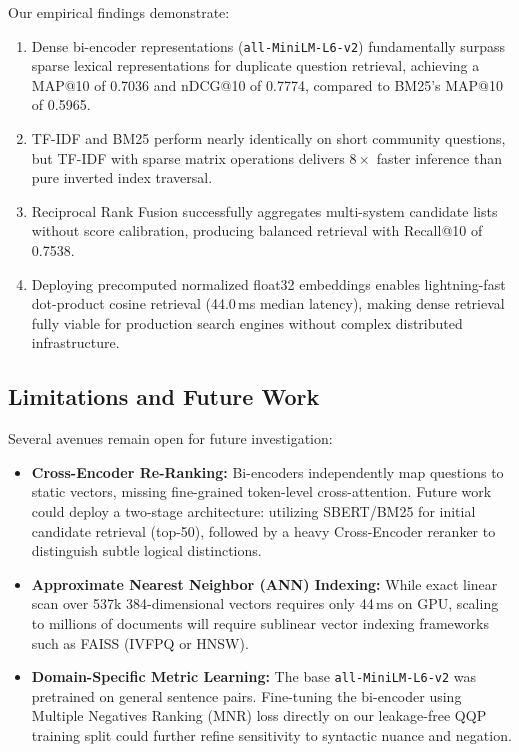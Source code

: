\documentclass[11pt,a4paper]{article}
\begin{document}
Our empirical findings demonstrate:
\begin{enumerate}[noitemsep,topsep=1pt]
    \item Dense bi-encoder representations (\texttt{all-MiniLM-L6-v2}) fundamentally surpass sparse lexical representations for duplicate question retrieval, achieving a MAP@10 of 0.7036 and nDCG@10 of 0.7774, compared to BM25's MAP@10 of 0.5965.
    \item TF-IDF and BM25 perform nearly identically on short community questions, but TF-IDF with sparse matrix operations delivers $8\times$ faster inference than pure inverted index traversal.
    \item Reciprocal Rank Fusion successfully aggregates multi-system candidate lists without score calibration, producing balanced retrieval with Recall@10 of 0.7538.
    \item Deploying precomputed normalized float32 embeddings enables lightning-fast dot-product cosine retrieval (44.0\,ms median latency), making dense retrieval fully viable for production search engines without complex distributed infrastructure.
\end{enumerate}

\subsection{Limitations and Future Work}
Several avenues remain open for future investigation:
\begin{itemize}[noitemsep,topsep=1pt]
    \item \textbf{Cross-Encoder Re-Ranking:} Bi-encoders independently map questions to static vectors, missing fine-grained token-level cross-attention. Future work could deploy a two-stage architecture: utilizing SBERT/BM25 for initial candidate retrieval (top-50), followed by a heavy Cross-Encoder reranker to distinguish subtle logical distinctions.
    \item \textbf{Approximate Nearest Neighbor (ANN) Indexing:} While exact linear scan over 537k 384-dimensional vectors requires only 44\,ms on GPU, scaling to millions of documents will require sublinear vector indexing frameworks such as FAISS (IVFPQ or HNSW).
    \item \textbf{Domain-Specific Metric Learning:} The base \texttt{all-MiniLM-L6-v2} was pretrained on general sentence pairs. Fine-tuning the bi-encoder using Multiple Negatives Ranking (MNR) loss directly on our leakage-free QQP training split could further refine sensitivity to syntactic nuance and negation.
\end{itemize}



\end{document}
